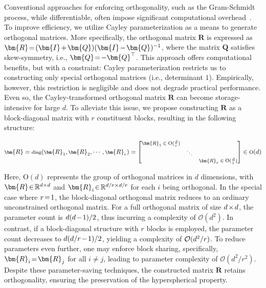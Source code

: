 Conventional approaches for enforcing orthogonality, such as the Gram-Schmidt process, while differentiable, often impose significant computational overhead~\cite{liu2021orthogonal}. To improve efficiency, we utilize Cayley parameterization as a means to generate orthogonal matrices. More specifically, the orthogonal matrix $\bm{R}$ is expressed as $\thickmuskip=2mu \medmuskip=2mu \bm{R} = (\bm{I} + \bm{Q})(\bm{I} - \bm{Q})^{-1}$, where the matrix $\bm{Q}$ satisfies skew-symmetry, i.e., $\thickmuskip=2mu \medmuskip=2mu \bm{Q} = -\bm{Q}^\top$. This approach offers computational benefits, but with a constraint: Cayley parameterization restricts us to constructing only special orthogonal matrices (i.e., determinant $1$). Empirically, however, this restriction is negligible and does not degrade practical performance. Even so, the Cayley-transformed orthogonal matrix $\bm{R}$ can become storage-intensive for large $d$. To alleviate this issue, we propose constructing $\bm{R}$ as a block-diagonal matrix with $r$ constituent blocks, resulting in the following structure:

\begin{equation}
    \footnotesize
    \bm{R} = \text{diag}(\bm{R}_1, \bm{R}_2, \cdots, \bm{R}_r) = \begin{bmatrix}
    \bm{R}_1 \in \text{O}(\frac{d}{r}) &  &\\
    &\ddots & \\
    & & \bm{R}_r \in \text{O}(\frac{d}{r})
    \end{bmatrix} \in \text{O}(d)
\end{equation}

Here, $\text{O}(d)$ represents the group of orthogonal matrices in $d$ dimensions, with $\thickmuskip=2mu \medmuskip=2mu \bm{R}\in\mathbb{R}^{d\times d}$ and $\thickmuskip=2mu \medmuskip=2mu \bm{R}_i\in\mathbb{R}^{d/r\times d/r}$ for each $i$ being orthogonal. In the special case where $\thickmuskip=2mu \medmuskip=2mu r=1$, the block-diagonal orthogonal matrix reduces to an ordinary unconstrained orthogonal matrix. For a full orthogonal matrix of size $\thickmuskip=2mu \medmuskip=2mu d\times d$, the parameter count is $\thickmuskip=2mu \medmuskip=2mu d(d-1)/2$, thus incurring a complexity of $\mathcal{O}(d^2)$. In contrast, if a block-diagonal structure with $r$ blocks is employed, the parameter count decreases to $\thickmuskip=2mu \medmuskip=2mu d(d/r-1)/2$, yielding a complexity of $\thickmuskip=2mu \medmuskip=2mu \mathcal{O}(d^2/r)$. To reduce parameters even further, one may enforce block sharing, specifically, $\thickmuskip=2mu \medmuskip=2mu \bm{R}_i=\bm{R}_j$ for all $i\neq j$, leading to parameter complexity of $\mathcal{O}(d^2/r^2)$. Despite these parameter-saving techniques, the constructed matrix $\bm{R}$ retains orthogonality, ensuring the preservation of the hyperspherical property.

